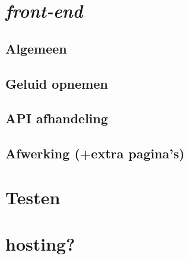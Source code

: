 \section{\textit{front-end}}
\subsection{Algemeen}
\subsection{Geluid opnemen}
\subsection{API afhandeling}
\subsection{Afwerking (+extra pagina's)}

\section{Testen}

\section{hosting?}
